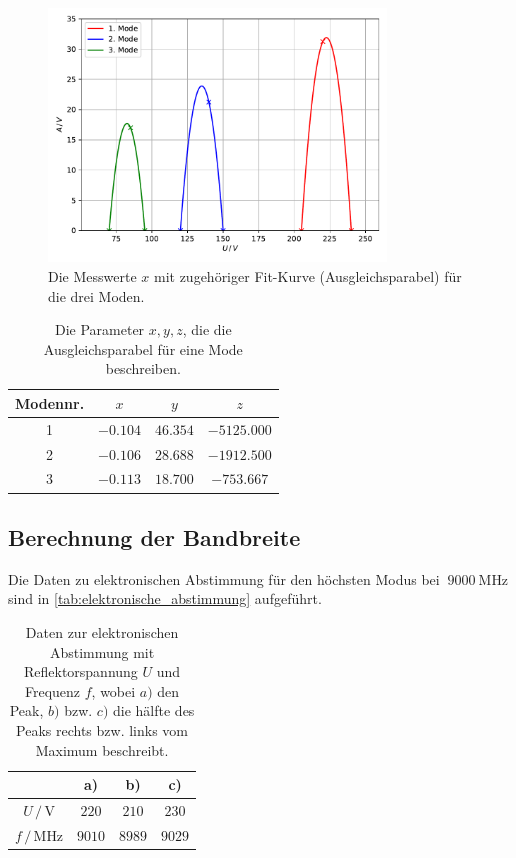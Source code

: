 \begin{figure}
    \centering
    \includegraphics[width=0.8\textwidth]{content/data/moden.pdf}
    \caption{Die Messwerte $x$ mit zugehöriger Fit-Kurve (Ausgleichsparabel) für die drei Moden. \cite{matplotlib}\cite{numpy}}
    \label{fig:moden}
\end{figure}

\begin{table}
    \centering
    \caption{Die Parameter $x, y, z$, die die Ausgleichsparabel für eine Mode beschreiben.}
    \begin{tabular}{c c c c}
        \toprule
        Modennr. & $x$ & $y$ & $z$ \\
        \midrule
        1 & $-0.104$ & $46.354$ & $-5125.000$ \\
        2 & $-0.106$ & $28.688$ & $-1912.500$ \\
        3 & $-0.113$ & $18.700$ & $-753.667$ \\
        \bottomrule
    \end{tabular}
    \label{tab:moden_ergebnisse}
\end{table}

\subsection{Berechnung der Bandbreite}
Die Daten zu elektronischen Abstimmung für den höchsten Modus bei $~\SI{9000}{\mega\hertz}$ sind in \autoref{tab:elektronische_abstimmung} aufgeführt.
\begin{table}
    \centering
    \caption{Daten zur elektronischen Abstimmung mit Reflektorspannung $U$ und Frequenz $f$, wobei $a)$ den Peak, $b)$ bzw. $c)$ die hälfte des Peaks rechts bzw. links vom Maximum beschreibt.}
    \begin{tabular}{c c c c}
        \toprule
        & a) & b) & c) \\
        \midrule
        $U \,/\, \si{\volt}$ & $220$ & $210$ & $230$ \\
        $f \,/\, \si{\mega\hertz}$ & $9010$ & $8989$ & $9029$ \\
    \end{tabular}
    \label{tab:elektronische_abstimmung}
\end{table}

